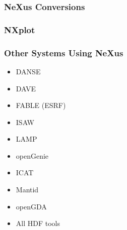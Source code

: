 \documentclass{beamer}
\begin{document}
\begin{frame} \frametitle{NeXus Conversions}
\begin{figure}[!ht]
\end{figure}
\end{frame}


\begin{frame} \frametitle{NXplot }
\begin{figure}[!ht]
\end{figure}
\end{frame}

\begin{frame} \frametitle{Other Systems Using NeXus}
\begin{itemize}
\item DANSE
\item DAVE
\item FABLE (ESRF)
\item ISAW
\item LAMP
\item openGenie
\item ICAT
\item Mantid
\item openGDA
\item All HDF tools
\end{itemize}
\end{frame}
\end{document}
